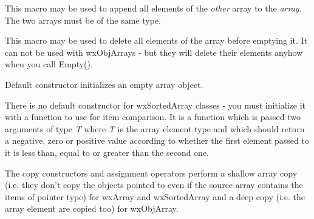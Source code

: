 \label{wxappendarray}


This macro may be used to append all elements of the {\it other} array to the 
{\it array}. The two arrays must be of the same type.

\label{wxcleararray}


This macro may be used to delete all elements of the array before emptying it.
It can not be used with wxObjArrays - but they will delete their elements anyhow
when you call Empty().

\label{wxarrayctordef}



Default constructor initializes an empty array object.


There is no default constructor for wxSortedArray classes - you must initialize it
with a function to use for item comparison. It is a function which is passed
two arguments of type {\it T} where {\it T} is the array element type and which
should return a negative, zero or positive value according to whether the first
element passed to it is less than, equal to or greater than the second one.

\label{wxarrayctorcopy}







The copy constructors and assignment operators perform a shallow array copy
(i.e. they don't copy the objects pointed to even if the source array contains
the items of pointer type) for wxArray and wxSortedArray and a deep copy (i.e.
the array element are copied too) for wxObjArray.

